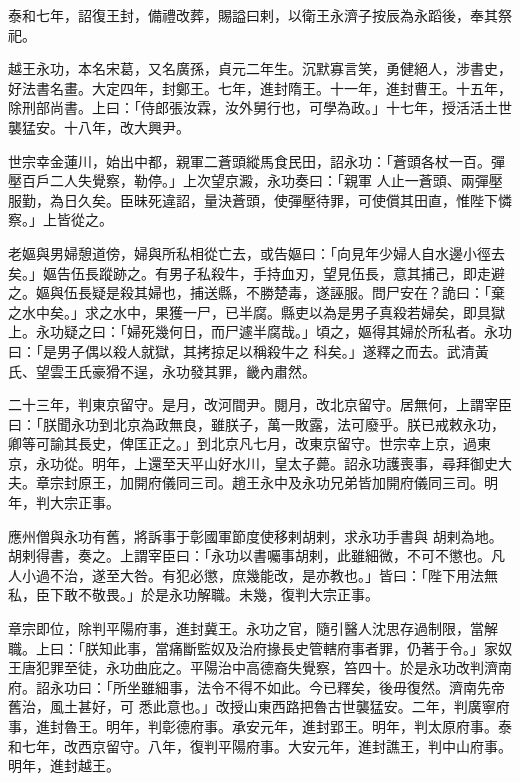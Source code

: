 \begin{pinyinscope}
 泰和七年，詔復王封，備禮改葬，賜謚曰剌，以衛王永濟子按辰為永蹈後，奉其祭祀。



 越王永功，本名宋葛，又名廣孫，貞元二年生。沉默寡言笑，勇健絕人，涉書史，好法書名畫。大定四年，封鄭王。七年，進封隋王。十一年，進封曹王。十五年，除刑部尚書。上曰：「侍郎張汝霖，汝外舅行也，可學為政。」十七年，授活活土世襲猛安。十八年，改大興尹。



 世宗幸金蓮川，始出中都，親軍二蒼頭縱馬食民田，詔永功：「蒼頭各杖一百。彈壓百戶二人失覺察，勒停。」上次望京澱，永功奏曰：「親軍
 人止一蒼頭、兩彈壓服勤，為日久矣。臣昧死違詔，量決蒼頭，使彈壓待罪，可使償其田直，惟陛下憐察。」上皆從之。



 老嫗與男婦憩道傍，婦與所私相從亡去，或告嫗曰：「向見年少婦人自水邊小徑去矣。」嫗告伍長蹤跡之。有男子私殺牛，手持血刃，望見伍長，意其捕己，即走避之。嫗與伍長疑是殺其婦也，捕送縣，不勝楚毒，遂誣服。問尸安在？詭曰：「棄之水中矣。」求之水中，果獲一尸，已半腐。縣吏以為是男子真殺若婦矣，即具獄上。永功疑之曰：「婦死幾何日，而尸遽半腐哉。」頃之，嫗得其婦於所私者。永功曰：「是男子偶以殺人就獄，其拷掠足以稱殺牛之
 科矣。」遂釋之而去。武清黃氏、望雲王氏豪猾不逞，永功發其罪，畿內肅然。



 二十三年，判東京留守。是月，改河間尹。閱月，改北京留守。居無何，上謂宰臣曰：「朕聞永功到北京為政無良，雖朕子，萬一敗露，法可廢乎。朕已戒敕永功，卿等可諭其長史，俾匡正之。」到北京凡七月，改東京留守。世宗幸上京，過東京，永功從。明年，上還至天平山好水川，皇太子薨。詔永功護喪事，尋拜御史大夫。章宗封原王，加開府儀同三司。趙王永中及永功兄弟皆加開府儀同三司。明年，判大宗正事。



 應州僧與永功有舊，將訴事于彰國軍節度使移剌胡剌，求永功手書與
 胡剌為地。胡剌得書，奏之。上謂宰臣曰：「永功以書囑事胡剌，此雖細微，不可不懲也。凡人小過不治，遂至大咎。有犯必懲，庶幾能改，是亦教也。」皆曰：「陛下用法無私，臣下敢不敬畏。」於是永功解職。未幾，復判大宗正事。



 章宗即位，除判平陽府事，進封冀王。永功之官，隨引醫人沈思存過制限，當解職。上曰：「朕知此事，當痛斷監奴及治府掾長史管轄府事者罪，仍著于令。」家奴王唐犯罪至徒，永功曲庇之。平陽治中高德裔失覺察，笞四十。於是永功改判濟南府。詔永功曰：「所坐雖細事，法令不得不如此。今已釋矣，後毋復然。濟南先帝舊治，風土甚好，可
 悉此意也。」改授山東西路把魯古世襲猛安。二年，判廣寧府事，進封魯王。明年，判彰德府事。承安元年，進封郢王。明年，判太原府事。泰和七年，改西京留守。八年，復判平陽府事。大安元年，進封譙王，判中山府事。明年，進封越王。




\end{pinyinscope}
